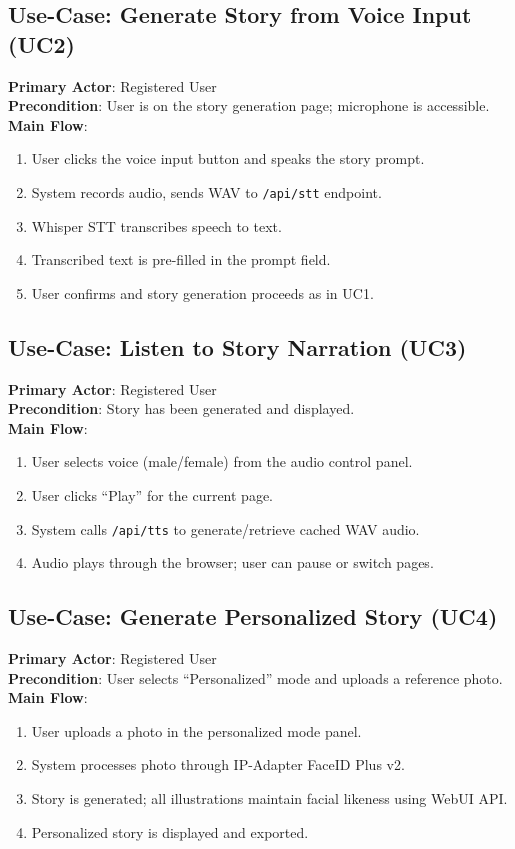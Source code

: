 \subsection{Use-Case: Generate Story from Voice Input (UC2)}
\textbf{Primary Actor}: Registered User \\
\textbf{Precondition}: User is on the story generation page; microphone is accessible. \\
\textbf{Main Flow}:
\begin{enumerate}
    \item User clicks the voice input button and speaks the story prompt.
    \item System records audio, sends WAV to \texttt{/api/stt} endpoint.
    \item Whisper STT transcribes speech to text.
    \item Transcribed text is pre-filled in the prompt field.
    \item User confirms and story generation proceeds as in UC1.
\end{enumerate}

\subsection{Use-Case: Listen to Story Narration (UC3)}
\textbf{Primary Actor}: Registered User \\
\textbf{Precondition}: Story has been generated and displayed. \\
\textbf{Main Flow}:
\begin{enumerate}
    \item User selects voice (male/female) from the audio control panel.
    \item User clicks ``Play'' for the current page.
    \item System calls \texttt{/api/tts} to generate/retrieve cached WAV audio.
    \item Audio plays through the browser; user can pause or switch pages.
\end{enumerate}

\subsection{Use-Case: Generate Personalized Story (UC4)}
\textbf{Primary Actor}: Registered User \\
\textbf{Precondition}: User selects ``Personalized'' mode and uploads a reference photo. \\
\textbf{Main Flow}:
\begin{enumerate}
    \item User uploads a photo in the personalized mode panel.
    \item System processes photo through IP-Adapter FaceID Plus v2.
    \item Story is generated; all illustrations maintain facial likeness using WebUI API.
    \item Personalized story is displayed and exported.
\end{enumerate}

